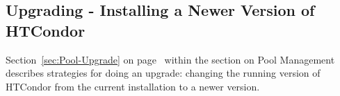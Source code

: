\subsection{\label{sec:upgrade-directions}Upgrading - Installing a Newer
Version of HTCondor}
Section~\ref{sec:Pool-Upgrade}  on page~\pageref{sec:Pool-Upgrade}
within the section on Pool Management describes 
strategies for doing an upgrade:
changing the running version of HTCondor 
from the current installation to a newer version.


